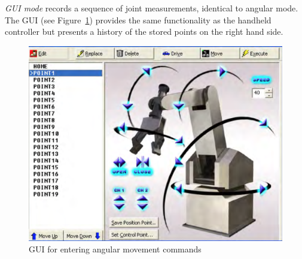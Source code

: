 \textit{GUI mode} records a sequence of joint measurements, identical to angular mode.
The GUI (see Figure~\ref{fig:gui}) provides the same functionality as the handheld controller but presents a history of the stored points on the right hand side.

\begin{figure}[tbph]
  \centering
  \includegraphics[width=0.4\linewidth]{graphics/gui}
  \caption{GUI for entering angular movement commands}
  \label{fig:gui}
\end{figure}

